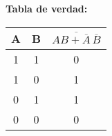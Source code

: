 \documentclass[a4paper, 12pt]{article}
\begin{document}
\begin{enumerate}
{\begin{multicols}{2}
                    \columnbreak

                    \noindent\textbf{Tabla de verdad:}

                    \begin{tabular}{c|c|c}
                        \textbf{A} & \textbf{B} & \(\overline{AB + \overline{A}\,\overline{B}}\) \\ \hline
                        1 & 1 & 0 \\
                        1 & 0 & 1 \\
                        0 & 1 & 1 \\
                        0 & 0 & 0 \\
                    \end{tabular}
                \end{multicols}
            }
    \end{enumerate}
\end{document}
